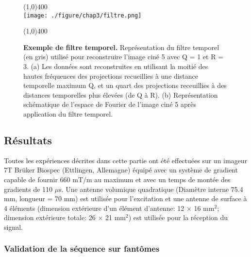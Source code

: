 \begin{figure}[H]
\centering \line(1,0){400} \\
\texttt{[image: ./figure/chap3/filtre.png]}
\caption[Exemple de filtre temporel.]{\label{fig:filtre} \textbf{Exemple de filtre temporel.} Représentation du filtre temporel (en gris) utilisé pour reconstruire l'image ciné 5 avec Q = 1 et R = 3. (a) Les données sont reconstruites en utilisant la moitié des hautes fréquences des projections recueillies à une distance temporelle maximum Q, et un quart des projections receuillies à des distances temporelles plus élevées (de Q à R). (b) Représentation schématique de l'espace de Fourier de l'image ciné 5 après application du filtre temporel.}
\line(1,0){400} \\ \end{figure}

\subsection{Résultats}

Toutes les expériences décrites dans cette partie ont été effectuées sur un imageur 7T Brüker Biospec (Ettlingen, Allemagne) équipé avec un système de gradient capable de fournir 660 mT/m au maximum et avec un temps de montée des gradients de 110 $\mu$s.
Une antenne volumique quadratique (Diamètre interne 75.4 mm, longueur = 70 mm) est utilisée pour l'excitation et une antenne de surface à 4 éléments (dimension extérieure d'un élément d'antenne: 12 $\times$ 16 mm$ ^2$; dimension extérieure totale: 26 $\times$ 21 mm$ ^2$) est utilisée pour la réception du signal.

\subsubsection{Validation de la séquence sur fantômes}


